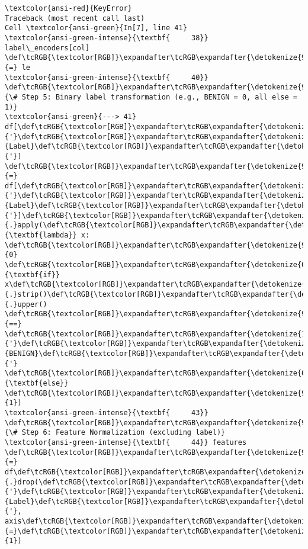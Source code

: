 \documentclass[11pt]{article}
\begin{document}
\begin{Verbatim}[commandchars=\\\{\}, frame=single, framerule=2mm, rulecolor=\color{outerrorbackground}]
\textcolor{ansi-red}{KeyError}                                  Traceback (most recent call last)
Cell \textcolor{ansi-green}{In[7], line 41}
\textcolor{ansi-green-intense}{\textbf{     38}}     label\_encoders[col] \def\tcRGB{\textcolor[RGB]}\expandafter\tcRGB\expandafter{\detokenize{98,98,98}}{=} le
\textcolor{ansi-green-intense}{\textbf{     40}} \def\tcRGB{\textcolor[RGB]}\expandafter\tcRGB\expandafter{\detokenize{95,135,135}}{\# Step 5: Binary label transformation (e.g., BENIGN = 0, all else = 1)}
\textcolor{ansi-green}{---> 41} df[\def\tcRGB{\textcolor[RGB]}\expandafter\tcRGB\expandafter{\detokenize{175,0,0}}{'}\def\tcRGB{\textcolor[RGB]}\expandafter\tcRGB\expandafter{\detokenize{175,0,0}}{Label}\def\tcRGB{\textcolor[RGB]}\expandafter\tcRGB\expandafter{\detokenize{175,0,0}}{'}] \def\tcRGB{\textcolor[RGB]}\expandafter\tcRGB\expandafter{\detokenize{98,98,98}}{=} df[\def\tcRGB{\textcolor[RGB]}\expandafter\tcRGB\expandafter{\detokenize{175,0,0}}{'}\def\tcRGB{\textcolor[RGB]}\expandafter\tcRGB\expandafter{\detokenize{175,0,0}}{Label}\def\tcRGB{\textcolor[RGB]}\expandafter\tcRGB\expandafter{\detokenize{175,0,0}}{'}]\def\tcRGB{\textcolor[RGB]}\expandafter\tcRGB\expandafter{\detokenize{98,98,98}}{.}apply(\def\tcRGB{\textcolor[RGB]}\expandafter\tcRGB\expandafter{\detokenize{0,135,0}}{\textbf{lambda}} x: \def\tcRGB{\textcolor[RGB]}\expandafter\tcRGB\expandafter{\detokenize{98,98,98}}{0} \def\tcRGB{\textcolor[RGB]}\expandafter\tcRGB\expandafter{\detokenize{0,135,0}}{\textbf{if}} x\def\tcRGB{\textcolor[RGB]}\expandafter\tcRGB\expandafter{\detokenize{98,98,98}}{.}strip()\def\tcRGB{\textcolor[RGB]}\expandafter\tcRGB\expandafter{\detokenize{98,98,98}}{.}upper() \def\tcRGB{\textcolor[RGB]}\expandafter\tcRGB\expandafter{\detokenize{98,98,98}}{==} \def\tcRGB{\textcolor[RGB]}\expandafter\tcRGB\expandafter{\detokenize{175,0,0}}{'}\def\tcRGB{\textcolor[RGB]}\expandafter\tcRGB\expandafter{\detokenize{175,0,0}}{BENIGN}\def\tcRGB{\textcolor[RGB]}\expandafter\tcRGB\expandafter{\detokenize{175,0,0}}{'} \def\tcRGB{\textcolor[RGB]}\expandafter\tcRGB\expandafter{\detokenize{0,135,0}}{\textbf{else}} \def\tcRGB{\textcolor[RGB]}\expandafter\tcRGB\expandafter{\detokenize{98,98,98}}{1})
\textcolor{ansi-green-intense}{\textbf{     43}} \def\tcRGB{\textcolor[RGB]}\expandafter\tcRGB\expandafter{\detokenize{95,135,135}}{\# Step 6: Feature Normalization (excluding label)}
\textcolor{ansi-green-intense}{\textbf{     44}} features \def\tcRGB{\textcolor[RGB]}\expandafter\tcRGB\expandafter{\detokenize{98,98,98}}{=} df\def\tcRGB{\textcolor[RGB]}\expandafter\tcRGB\expandafter{\detokenize{98,98,98}}{.}drop(\def\tcRGB{\textcolor[RGB]}\expandafter\tcRGB\expandafter{\detokenize{175,0,0}}{'}\def\tcRGB{\textcolor[RGB]}\expandafter\tcRGB\expandafter{\detokenize{175,0,0}}{Label}\def\tcRGB{\textcolor[RGB]}\expandafter\tcRGB\expandafter{\detokenize{175,0,0}}{'}, axis\def\tcRGB{\textcolor[RGB]}\expandafter\tcRGB\expandafter{\detokenize{98,98,98}}{=}\def\tcRGB{\textcolor[RGB]}\expandafter\tcRGB\expandafter{\detokenize{98,98,98}}{1})


\end{Verbatim}
\end{document}
